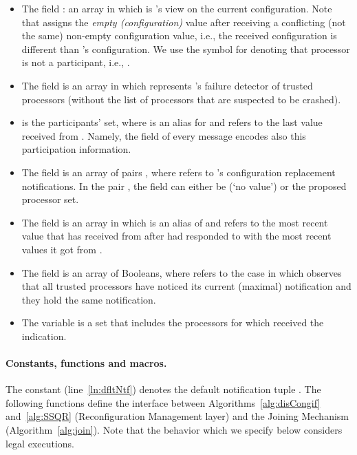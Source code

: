 \documentclass[11pt]{article}
\begin{document}
\begin{itemize}

\item The field : an array in which  is 's view on the current configuration. Note that  assigns the \emph{empty (configuration)} value  after receiving a conflicting (not the same) non-empty configuration value, i.e., the received configuration is different than 's configuration. We use the symbol  for denoting that processor  is not a participant, i.e., .

\item The field  is  an array in which  represents 's failure detector of trusted processors (without the list of processors that are suspected to be crashed). 


\item  is the participants' set, where  is an alias for  and  refers to the last value received from . Namely, the  field of every message encodes also this participation information.


\item The field  is an array of pairs , where  refers to 's configuration replacement notifications. In the pair , the field  can either be  (`no value') or the proposed processor set. 

\item The field  is an array in which  is an alias of   and  refers to the most recent value that  has received from  after  had responded to  with the most recent values it got from .

\item The field  is an array of Booleans, where  refers to the case in which  observes that all trusted processors have noticed its current (maximal) notification and they hold the same notification. 


\item The variable  is a set that includes the processors  for which  received the  indication. 

\end{itemize}

\paragraph{Constants, functions and macros.}
The constant  (line~\ref{ln:dfltNtf}) denotes the default notification tuple .
The following functions define the interface between Algorithms~\ref{alg:disCongif} and~\ref{alg:SSQR} (Reconfiguration Management layer) and the Joining Mechanism (Algorithm~\ref{alg:join}). Note that the behavior which we specify below considers legal executions.  
\end{document}
